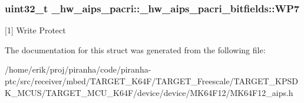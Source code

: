 \subsubsection[{\texorpdfstring{W\+P7}{WP7}}]{\setlength{\rightskip}{0pt plus 5cm}uint32\+\_\+t \+\_\+hw\+\_\+aips\+\_\+pacri\+::\+\_\+hw\+\_\+aips\+\_\+pacri\+\_\+bitfields\+::\+W\+P7}\hypertarget{struct__hw__aips__pacri_1_1__hw__aips__pacri__bitfields_a95772accdae6e90c613e82ec62f3bab7}{}\label{struct__hw__aips__pacri_1_1__hw__aips__pacri__bitfields_a95772accdae6e90c613e82ec62f3bab7}
\mbox{[}1\mbox{]} Write Protect 

The documentation for this struct was generated from the following file\+:\begin{DoxyCompactItemize}
\item 
/home/erik/proj/piranha/code/piranha-\/ptc/src/receiver/mbed/\+T\+A\+R\+G\+E\+T\+\_\+\+K64\+F/\+T\+A\+R\+G\+E\+T\+\_\+\+Freescale/\+T\+A\+R\+G\+E\+T\+\_\+\+K\+P\+S\+D\+K\+\_\+\+M\+C\+U\+S/\+T\+A\+R\+G\+E\+T\+\_\+\+M\+C\+U\+\_\+\+K64\+F/device/device/\+M\+K64\+F12/M\+K64\+F12\+\_\+aips.\+h\end{DoxyCompactItemize}
